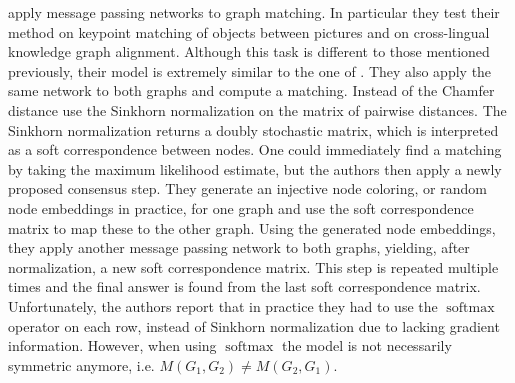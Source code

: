 \cite{fey2020_update} apply message passing networks to graph matching. In particular they test their method on keypoint matching of objects between pictures and on cross-lingual knowledge graph alignment. Although this task is different to those mentioned previously, their model is extremely similar to the one of \cite{riba2018}. They also apply the same network to both graphs and compute a matching. Instead of the Chamfer distance \cite{fey2020_update} use the Sinkhorn normalization \cite{sinkhorn2013} on the matrix of pairwise distances. The Sinkhorn normalization returns a doubly stochastic matrix, which is interpreted as a soft correspondence between nodes. One could immediately find a matching by taking the maximum likelihood estimate, but the authors then apply a newly proposed consensus step. They generate an injective node coloring, or random node embeddings in practice, for one graph and use the soft correspondence matrix to map these to the other graph. Using the generated node embeddings, they apply another message passing network to both graphs, yielding, after normalization, a new soft correspondence matrix. This step is repeated multiple times and the final answer is found from the last soft correspondence matrix. Unfortunately, the authors report that in practice they had to use the $\operatorname{softmax}$ operator on each row, instead of Sinkhorn normalization due to lacking gradient information. However, when using $\operatorname{softmax}$ the model is not necessarily symmetric anymore, i.e. $M(G_1, G_2) \neq M(G_2, G_1)$.






